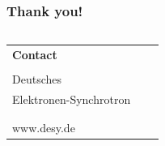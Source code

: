 \begin{frame}
\frametitle{Thank you!}
\vfill{}
\vspace*{3.5cm}


\fontsize{8}{9}\selectfont
\begin{columns}
	\hspace*{-0.8em}
	\hspace*{-1em}  %
	\begin{column}{\textwidth}
		\begin{tabular}{lll}
		\textbf{Contact}&\hspace*{0.5cm} & \\
						&\hspace*{0.5cm} & \\
		\hspace*{-0.4mm}\DESYWord{}Deutsches&\hspace*{0.5cm} & \AUTHOR \\
		Elektronen-Synchrotron &\hspace*{0.5cm} \\%
							&\hspace*{0.5cm} & \GROUP  \\
							&\hspace*{0.5cm} & \MailTo{\EMAIL}\\
		www.desy.de			%
		\end{tabular}
	\end{column}
\end{columns}
\end{frame}


